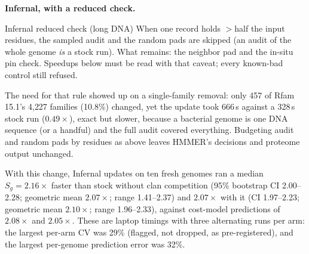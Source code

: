 \documentclass[letterpaper,twocolumn,10pt]{article}
\theoremstyle{definition}
\begin{document}
\textbf{Infernal, with a reduced check.}
\begin{plainbox}{Infernal reduced check (long DNA)}
When one record holds $>$half the input residues, the sampled audit and the random pads are skipped (an audit of the whole genome \textit{is} a stock run).
What remains: the neighbor pad and the in\nobreakdash-situ pin check. Speedups below must be read with that caveat; every known\nobreakdash-bad control still refused.
\end{plainbox}
The need for that rule showed up on a single\nobreakdash-family removal: only 457 of Rfam 15.1's 4{,}227 families (10.8\%) changed, yet the update took 666\,s against a 328\,s stock run ($0.49\times$), exact but slower, because a bacterial genome is one DNA sequence (or a handful) and the full audit covered everything. Budgeting audit and random pads by residues as above leaves HMMER's decisions and proteome output unchanged.

With this change, Infernal updates on ten fresh genomes ran a median $S_g = 2.16\times$ faster than stock without clan
competition (95\% bootstrap CI 2.00--2.28; geometric mean $2.07\times$; range 1.41--2.37) and $2.07\times$ with it (CI
1.97--2.23; geometric mean $2.10\times$; range 1.96--2.33), against cost\nobreakdash-model predictions of $2.08\times$ and $2.05\times$.
These are laptop timings with three alternating runs per arm: the largest per\nobreakdash-arm CV was 29\% (flagged, not dropped, as
pre\nobreakdash-registered), and the largest per\nobreakdash-genome prediction error was 32\%.
\end{document}
